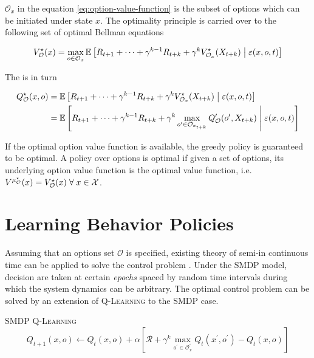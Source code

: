 $\mathcal{O}_x$ in the equation \ref{eq:option-value-function} is the subset of
options which can be initiated under state $x$. The optimality principle is carried over
to the following set of optimal Bellman equations

\begin{equation}
V_{\mathcal{O}}^\star(x) = \max_{o \in \mathcal{O}_x} \operatorname{\mathbb{E}} \left[ R_{t+1} + \dots + \gamma^{k-1}R_{t+k} + \gamma^k V_{\mathcal{O}_x}^\star(X_{t+k})  \;\middle\vert\; \varepsilon(x, o, t) \right]
\end{equation}

The  is in turn

\begin{align}
Q_{\mathcal{O}}^\star(x, o) &= \operatorname{\mathbb{E}} \left[ R_{t+1} + \dots +
\gamma^{k-1}R_{t+k} + \gamma^k V_{\mathcal{O}_x}^\star(X_{t+k})  \;\middle\vert\;
\varepsilon(x, o, t) \right] \notag \\
&= \operatorname{\mathbb{E}} \left[ R_{t+1} + \dots + \gamma^{k-1}R_{t+k} + \gamma^k
\max_{o^\prime \in \mathcal{O}_{x_{t+k}}} Q_\mathcal{O}^\prime(o^\prime, X_{t+k}) 
\;\middle\vert\; \varepsilon(x, o, t) \right]
\label{eq:optimal-option-value-function}
\end{align}

If the optimal option value function is
available, the greedy policy is guaranteed to be optimal. A policy over options is
optimal if given a set of options, its underlying option value function is the optimal
value function, i.e. $V^{\mu_\mathcal{O}^\star}(x) = V_\mathcal{O}^\star(x)\; \forall \; x \in \mathcal{X}$.

\section{Learning Behavior Policies}

Assuming that an options set $\mathcal{O}$ is specified, existing theory
of  semi-\mdps in continuous time can be
applied to solve the control problem \parencite{Puterman1994, Bradtke1994}. Under the SMDP model, decision are taken at certain \textit{epochs} spaced by random time intervals during which the system dynamics can be arbitrary. The optimal control problem can be solved by an
extension of \textsc{Q-Learning} to the SMDP case.

\begin{defn}{\textsc{SMDP Q-Learning}}
\begin{equation}
Q_{t+1}(x, o) \leftarrow Q_{t}(x, o) + \alpha \left[ \mathcal{R} + \gamma^k
\max_{o^\prime \in \mathcal{O}_x^\prime} Q_{t}(x^\prime, o^\prime) -
Q_t(x, o) \right]
\label{eq:smdp-qlearning}
\end{equation}
\end{defn}

